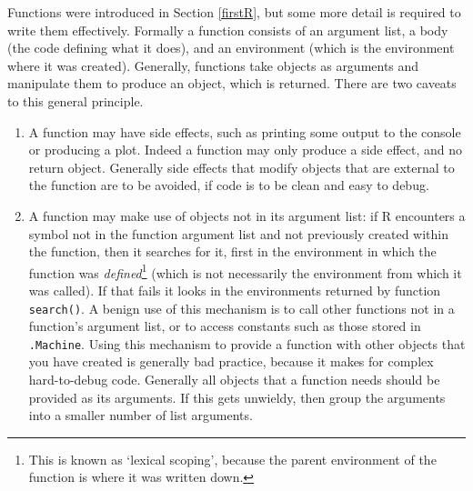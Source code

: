 \documentclass[10pt] {article}
\theoremstyle{definition}
\begin{document}
Functions were introduced in Section \ref{firstR}, but some more detail is required to write them effectively.  Formally a function consists of an argument list, a body (the code defining what it does), and an environment (which is the environment where it was created). Generally, functions take objects as arguments and manipulate them to produce an object, which is returned. There are two caveats to this general principle. 
\begin{enumerate}
\item A function may have side effects, such as printing some output to the console or producing a plot. Indeed a function may only produce a side effect, and no return object. Generally side effects that modify objects that are external to the function are to be avoided, if code is to be clean and easy to debug. 
\item A function may make use of objects not in its argument list: if R encounters a symbol not in the function argument list and not previously created within the function, then it searches for it, first in the environment in which the function was {\em defined}\footnote{This is known as `lexical scoping', because the parent environment of the  function is where it was written down.} (which is not necessarily the environment from which it was called). If that fails it looks in the environments returned by function {\lstinline+search()+}. A benign use of this mechanism is to call other functions not in a function's argument list, or to access constants such as those stored in {\lstinline+.Machine+}. Using this mechanism to provide a function with other objects that you have created is generally bad practice, because it makes for complex hard-to-debug code. Generally all objects that a function needs should be provided as its arguments. If this gets unwieldy, then group the arguments into a smaller number of list arguments.   
\end{enumerate}
\end{document}
